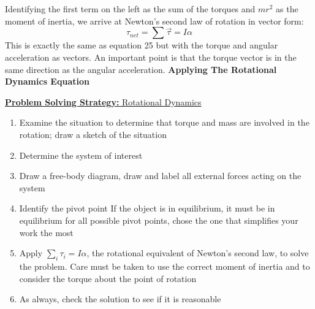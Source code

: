 \documentclass[a4paper]{article}
\let\bf\textbf
\begin{document}
Identifying the first term on the left as the sum of the torques and $mr^2$ as the moment of inertia, we arrive at Newton's second law of rotation in vector form:
\begin{equation}
    \tau_{net} = \sum\vec{\tau} = I\alpha
\end{equation}
This is exactly the same as equation 25 but with the torque and angular acceleration as vectors. An important point is that the torque vector is in the same direction as the angular acceleration.
\newpage\noindent
\bf{Applying The Rotational Dynamics Equation}
\begin{shaded}
    \underline{\bf{Problem Solving Strategy:} Rotational Dynamics}
    \begin{enumerate}
        \item Examine the situation to determine that torque and mass are involved in the rotation; draw a sketch of the situation
        \item Determine the system of interest
        \item Draw a free-body diagram, draw and label all external forces acting on the system
        \item Identify the pivot point If the object is in equilibrium, it must be in equilibrium for all possible pivot points, chose the one that simplifies your work the most
        \item Apply $\sum\limits_i\tau_i = I\alpha$, the rotational equivalent of Newton's second law, to solve the problem. Care must be taken to use the correct moment of inertia and to consider the torque about the point of rotation
        \item As always, check the solution to see if it is reasonable
    \end{enumerate}    
\end{shaded}
\end{document}
